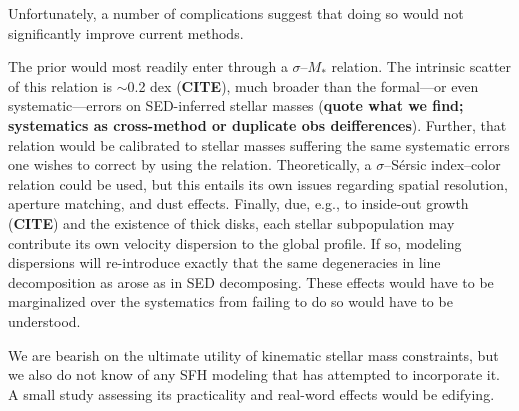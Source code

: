 \documentclass[a4paper,fleqn,usenatbib]{mnras}
\newcommand{\Mstel}{M_\ast}
\newcommand{\bfr}{\bf\color{red}}
\newcommand{\CITE}{{\bfr CITE}}
\begin{document}
Unfortunately, a number of complications suggest that doing so would not significantly improve
current methods.

The prior would most readily enter through a $\sigma$--$\Mstel$ relation. The intrinsic scatter
of this relation is $\sim$0.2 dex (\CITE), much broader than the formal---or even systematic---errors 
on SED-inferred stellar masses ({\bfr quote what we find; systematics as cross-method or duplicate
obs deifferences}). Further, that relation would be calibrated to stellar masses suffering the same 
systematic errors one wishes to correct by using the relation. Theoretically, a $\sigma$--S\'{e}rsic 
index--color relation could be used, but this entails its own issues regarding spatial resolution, 
aperture matching, and dust effects. Finally, due, e.g., to inside-out growth (\CITE) 
and the existence of thick disks, each stellar subpopulation may contribute its own velocity 
dispersion to the global profile. If so, modeling dispersions will re-introduce exactly that the same 
degeneracies in line decomposition as arose as in SED decomposing. These 
effects would have to be marginalized over the systematics from failing to do so would have to
be understood.

We are bearish on the ultimate utility of kinematic stellar mass constraints, 
but we also do not know of any SFH modeling that has attempted to incorporate it. A small 
study assessing its practicality and real-word effects would be edifying.

%
%
%
%
%
%
\end{document}
